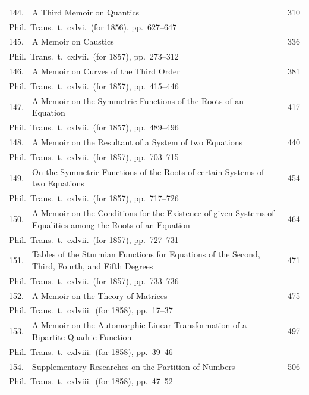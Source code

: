 \documentclass[11pt,a4paper]{article}
\theoremstyle{plain}
\begin{document}
\begin{longtable}{rp{8cm}l}
144. & A Third Memoir on Quantics & 310\\
\multicolumn{3}{l}{\small Phil.\ Trans.\ t.\ cxlvi.\ (for 1856), pp.\ 627--647}\\[0.5em]
145. & A Memoir on Caustics & 336\\
\multicolumn{3}{l}{\small Phil.\ Trans.\ t.\ cxlvii.\ (for 1857), pp.\ 273--312}\\[0.5em]
146. & A Memoir on Curves of the Third Order & 381\\
\multicolumn{3}{l}{\small Phil.\ Trans.\ t.\ cxlvii.\ (for 1857), pp.\ 415--446}\\[0.5em]
147. & A Memoir on the Symmetric Functions of the Roots of an Equation & 417\\
\multicolumn{3}{l}{\small Phil.\ Trans.\ t.\ cxlvii.\ (for 1857), pp.\ 489--496}\\[0.5em]
148. & A Memoir on the Resultant of a System of two Equations & 440\\
\multicolumn{3}{l}{\small Phil.\ Trans.\ t.\ cxlvii.\ (for 1857), pp.\ 703--715}\\[0.5em]
149. & On the Symmetric Functions of the Roots of certain Systems of two Equations & 454\\
\multicolumn{3}{l}{\small Phil.\ Trans.\ t.\ cxlvii.\ (for 1857), pp.\ 717--726}\\[0.5em]
150. & A Memoir on the Conditions for the Existence of given Systems of Equalities among the Roots of an Equation & 464\\
\multicolumn{3}{l}{\small Phil.\ Trans.\ t.\ cxlvii.\ (for 1857), pp.\ 727--731}\\[0.5em]
151. & Tables of the Sturmian Functions for Equations of the Second, Third, Fourth, and Fifth Degrees & 471\\
\multicolumn{3}{l}{\small Phil.\ Trans.\ t.\ cxlvii.\ (for 1857), pp.\ 733--736}\\[0.5em]
152. & A Memoir on the Theory of Matrices & 475\\
\multicolumn{3}{l}{\small Phil.\ Trans.\ t.\ cxlviii.\ (for 1858), pp.\ 17--37}\\[0.5em]
153. & A Memoir on the Automorphic Linear Transformation of a Bipartite Quadric Function & 497\\
\multicolumn{3}{l}{\small Phil.\ Trans.\ t.\ cxlviii.\ (for 1858), pp.\ 39--46}\\[0.5em]
154. & Supplementary Researches on the Partition of Numbers & 506\\
\multicolumn{3}{l}{\small Phil.\ Trans.\ t.\ cxlviii.\ (for 1858), pp.\ 47--52}\\[0.5em]

\end{longtable}
\end{document}
